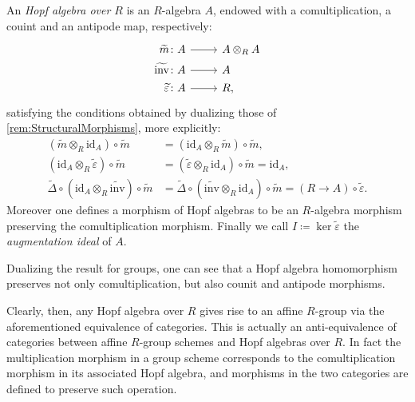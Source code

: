 \begin{defn}\label{defn:HopfAlgebra}
	An {\em Hopf algebra over $R$} is an $R$-algebra $A$,
	endowed with a comultiplication, a couint and an antipode map,
	respectively:
	\begin{equation*}
			\begin{tikzcd}[row sep = 0ex
         ,/tikz/column 1/.append style={anchor=base east}
         ,/tikz/column 2/.append style={anchor=base west}
         ,/tikz/column 3/.append style={anchor=base east}]
			\widetilde{m}\colon A \arrow[r, "", rightarrow] &
			A \otimes_R A \\
			\widetilde{\mathrm{inv}}\colon A \arrow[r, "", rightarrow] &
			A \phantom{\otimes_R} \\
			\widetilde{\varepsilon} \colon A \arrow[r, "", rightarrow] &
			R,
		\end{tikzcd}
	\end{equation*} 
	satisfying the conditions obtained by dualizing those
	of \cref{rem:StructuralMorphisms}, more explicitly:
	\begin{align*}
		( \widetilde{m} \otimes_R \mathrm{id}_{ A } ) \circ \widetilde{m} &=
		( \mathrm{id}_{ A } \otimes_R \widetilde{m} ) \circ \widetilde{m},\\
		( \mathrm{id}_{ A } \otimes_R \widetilde{\varepsilon} ) \circ \widetilde{m} &=
		( \widetilde{\varepsilon} \otimes_R \mathrm{id}_{ A } ) \circ \widetilde{m} =
		\mathrm{id}_{ A },\\
		\widetilde{\Delta} \circ ( \mathrm{id}_{ A } \otimes_R \widetilde{\mathrm{inv}} ) 
		\circ \widetilde{m} &=
		\widetilde{\Delta} \circ ( \widetilde{\mathrm{inv}} \otimes_R \mathrm{id}_{ A } ) 
		\circ \widetilde{m} =
		(R \to A) \circ \widetilde{\varepsilon}
	.\end{align*} 
	Moreover one defines a morphism of Hopf algebras to be an $R$-algebra
	morphism preserving the comultiplication morphism.
	Finally we call $I \coloneqq \ker \widetilde{\varepsilon}$ the 
	{\em augmentation ideal} of $A$.
\end{defn}


\begin{rem}[]
	Dualizing the result for groups, one can see that a Hopf algebra
	homomorphism preserves not only comultiplication, but also
	counit and antipode morphisms.
\end{rem}


\begin{rem}
	Clearly, then, any Hopf algebra over $R$ gives rise
	to an affine $R$-group via the aforementioned equivalence of categories.
	This is actually an anti-equivalence of categories between affine
	$R$-group schemes and Hopf algebras over $R$.
	In fact	the multiplication morphism in a group scheme
	corresponds to the comultiplication morphism in its 
	associated Hopf algebra, and morphisms in the two categories are defined
	to preserve such operation.
\end{rem}



